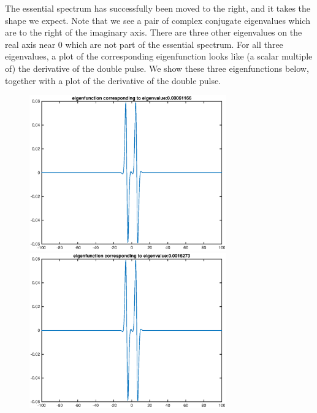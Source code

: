 \documentclass[12pt]{article}
\begin{document}
The essential spectrum has successfully been moved to the right, and it takes the shape we expect. Note that we see a pair of complex conjugate eigenvalues which are to the right of the imaginary axis. There are three other eigenvalues on the real axis near 0 which are not part of the essential spectrum. For all three eigenvalues, a plot of the corresponding eigenfunction looks like (a scalar multiple of) the derivative of the double pulse. We show these three eigenfunctions below, together with a plot of the derivative of the double pulse.

\begin{figure}[H]
\includegraphics[width=8.5cm]{eig1fn1.eps}
\includegraphics[width=8.5cm]{eig1fn2.eps}
\end{figure}
\end{document}
